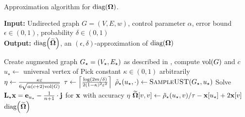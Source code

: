\begin{algorithm}[t]
\footnotesize
{}
\caption{\footnotesize Approximation algorithm for $\diag{\Fmat}$.}
\label{algo:flinv-diag-apx}
\textbf{Input:} Undirected graph $G = (V, E, w)$, control parameter $\alpha$,
error bound $\epsilon \in (0, 1)$, probability $\delta\in (0, 1)$\\
\textbf{Output:} $\diag{\Fmatapx}$, \ie an $(\epsilon, \delta)$-approximation of $\diag{\Fmat}$

\begin{algorithmic}[1]
\State Create augmented graph $G_{\star} = (V_\star, E_\star)$ as described
in , compute $\text{vol}(G)$ and $c$
\label{line:flinv-diag-apx:aug-graph}
\State$u_\star \gets$ universal vertex of \gstar\label{line:flinv-diag-apx:pivot}
\State Pick constant $\kappa\in(0, 1)$ arbitrarily
\State$\eta \gets \frac{\kappa\varepsilon}{6\sqrt{\alpha(c+2)\text{vol}(G)}}$
\label{line:flinv-diag-apx:eta}
\State$\tau \gets \ceil{\frac{\log(2m/\delta)}{2(1 - \kappa)^2\epsilon^2}}$
\label{line:flinv-diag-apx:ust-sample-1}
\State$\tilde{\rho}_{\star}(u_\star, \cdot) \gets\textsc{SampleUST}(G_{\star}, u_\star)$
\label{line:flinv-diag-apx:ust-sample-2}
\EndFor
\State Solve $\mathbf{L_{\star}}\mathbf{x} = \mathbf{e}_{u_\star} - \frac{1}{n + 1}\cdot\mathbf{j}$ for $\mathbf{x}$
with accuracy $\eta$
\label{line:flinv-diag-apx:lapl-system}
\label{line:flinv-diag-apx:update-rdist-for}
\State$\widetilde{\bm{\Omega}}[v, v] \gets \tilde{\rho}_{\star}(u_\star, v)/\tau - \mathbf{x}[u_\star] + 2\mathbf{x}[v]$
\label{line:flinv-diag-apx:update-rdist}
\EndFor
\State\Return$\diag{\Fmatapx}$
\end{algorithmic}
\end{algorithm}
